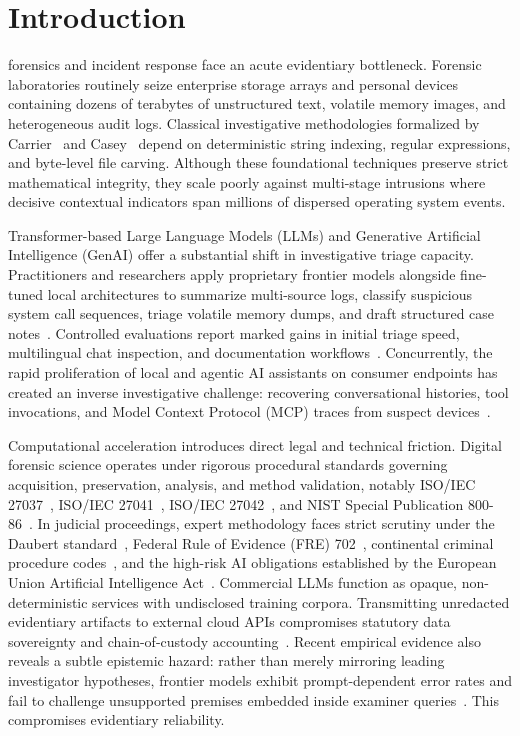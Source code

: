 \section{Introduction}
\label{sec:introduction}

 forensics and incident response face an acute evidentiary bottleneck. Forensic laboratories routinely seize enterprise storage arrays and personal devices containing dozens of terabytes of unstructured text, volatile memory images, and heterogeneous audit logs. Classical investigative methodologies formalized by Carrier~\cite{carrier2005} and Casey~\cite{casey2011} depend on deterministic string indexing, regular expressions, and byte-level file carving. Although these foundational techniques preserve strict mathematical integrity, they scale poorly against multi-stage intrusions where decisive contextual indicators span millions of dispersed operating system events.

Transformer-based Large Language Models (LLMs) and Generative Artificial Intelligence (GenAI) offer a substantial shift in investigative triage capacity. Practitioners and researchers apply proprietary frontier models alongside fine-tuned local architectures to summarize multi-source logs, classify suspicious system call sequences, triage volatile memory dumps, and draft structured case notes~\cite{scanlon2023_digital, scanlon2023_chatgpt, oh2024_volgpt}. Controlled evaluations report marked gains in initial triage speed, multilingual chat inspection, and documentation workflows~\cite{michelet2024_chatgpt, kim2025_digital, wickramasekara2025_exploring}. Concurrently, the rapid proliferation of local and agentic AI assistants on consumer endpoints has created an inverse investigative challenge: recovering conversational histories, tool invocations, and Model Context Protocol (MCP) traces from suspect devices~\cite{walker2024_forensic, xu2026_recovering, satter2026_with}.

Computational acceleration introduces direct legal and technical friction. Digital forensic science operates under rigorous procedural standards governing acquisition, preservation, analysis, and method validation, notably ISO/IEC 27037~\cite{iso27037_2012}, ISO/IEC 27041~\cite{iso27041_2015}, ISO/IEC 27042~\cite{iso27042_2015}, and NIST Special Publication 800-86~\cite{nist_sp800_86}. In judicial proceedings, expert methodology faces strict scrutiny under the Daubert standard~\cite{daubert1993}, Federal Rule of Evidence (FRE) 702~\cite{fre702_2023}, continental criminal procedure codes~\cite{portugal_cpp}, and the high-risk AI obligations established by the European Union Artificial Intelligence Act~\cite{eu_ai_act_2024}. Commercial LLMs function as opaque, non-deterministic services with undisclosed training corpora. Transmitting unredacted evidentiary artifacts to external cloud APIs compromises statutory data sovereignty and chain-of-custody accounting~\cite{sharma2025_forensicllm, eu_led_2016}. Recent empirical evidence also reveals a subtle epistemic hazard: rather than merely mirroring leading investigator hypotheses, frontier models exhibit prompt-dependent error rates and fail to challenge unsupported premises embedded inside examiner queries~\cite{trivedi2026_when}. This compromises evidentiary reliability.


